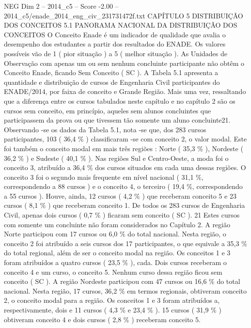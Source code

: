\begin{textsample}{NEG Dim 2 – 2014\_c5 – Score -2.00 – 2014\_c5/enade\_2014\_eng\_civ\_231731472f.txt}  \label{ex:f2_neg_123}
CAPÍTULO 5 DISTRIBUIÇÃO DOS CONCEITOS 5.1 PANORAMA NACIONAL DA DISTRIBUIÇÃO DOS CONCEITOS O Conceito Enade é um indicador de qualidade que avalia o desempenho dos estudantes a partir dos resultados do ENADE.
Os valores possíveis vão de 1 ( pior situação ) a 5 ( melhor situação ).
As Unidades de Observação com apenas um ou sem nenhum concluinte participante não obtêm o Conceito Enade, ficando Sem Conceito ( SC ).
A Tabela 5.1 apresenta a quantidade e distribuição de cursos de Engenharia Civil participantes do ENADE/2014, por faixa de conceito e Grande Região.
Mais uma vez, ressaltando que a diferença entre os cursos tabulados neste capítulo e no capítulo 2 são os cursos sem conceito, em princípio, aqueles sem alunos concluintes que participassem da prova ou que tivessem tão somente um aluno concluinte21.
Observando -se os dados da Tabela 5.1, nota -se que, dos 283 cursos participantes, 103 ( 36,4 \% ) classificaram -se com conceito 2, o valor modal.
Este foi também o conceito modal em mais três regiões : Norte ( 35,3 \% ), Nordeste ( 36,2 \% ) e Sudeste ( 40,1 \% ).
Nas regiões Sul e Centro-Oeste, a moda foi o conceito 3, atribuído a 36,4 \% dos cursos situados em cada uma dessas regiões.
O conceito 3 foi o segundo mais frequente em nível nacional ( 31,1 \%, correspondendo a 88 cursos ) e o conceito 4, o terceiro ( 19,4 \%, correspondendo a 55 cursos ).
Houve, ainda, 12 cursos ( 4,2 \% ) que receberam conceito 5 e 23 cursos ( 8,1 \% ) que receberam conceito 1.
De todos os 283 cursos de Engenharia Civil, apenas dois cursos ( 0,7 \% ) ficaram sem conceito ( SC ). 21 Estes cursos com somente um concluinte não foram considerados no Capítulo 2.
A região Norte participou com 17 cursos ou 6,0 \% do total nacional.
Nesta região, o conceito 2 foi atribuído a seis cursos dos 17 participantes, o que equivale a 35,3 \% do total regional, além de ser o conceito modal na região.
Os conceitos 1 e 3 foram atribuídos a quatro cursos ( 23,5 \% ), cada.
Dois cursos receberam o conceito 4 e um curso, o conceito 5.
Nenhum curso dessa região ficou sem conceito ( SC ).
A região Nordeste participou com 47 cursos ou 16,6 \% do total nacional.
Nesta região, 17 cursos, 36,2 \% em termos regionais, obtiveram conceito 2, o conceito modal para a região.
Os conceitos 1 e 3 foram atribuídos a, respectivamente, dois e 11 cursos ( 4,3 \% e 23,4 \% ). 15 cursos ( 31,9 \% ) obtiveram conceito 4 e dois cursos ( 2,8 \% ) receberam conceito 5.

\end{textsample}
